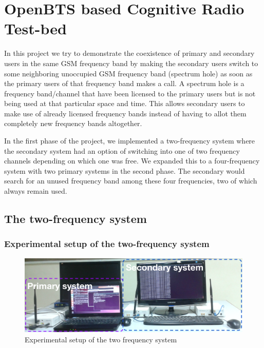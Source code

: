 \chapter{OpenBTS based Cognitive Radio Test-bed}

In this project we try to demonstrate the coexistence of primary and secondary
users in the same GSM frequency band by making the secondary users switch to 
some neighboring unoccupied GSM frequency band (spectrum hole) as soon as the 
primary users of that frequency band makes a call. A spectrum hole is a 
frequency band/channel that have been licensed to the primary users but is not 
being used at that particular space and time. This allows secondary users to 
make use of already licensed frequency bands instead of having to allot them 
completely new frequency bands altogether.

In the first phase of the project, we implemented a two-frequency system where
the secondary system had an option of switching into one of two frequency 
channels depending on which one was free. We expanded this to a four-frequency
system with two primary systems in the second phase. The secondary would 
search for an unused frequency band among these four frequencies, two of which
always remain used.

\section{The two-frequency system}
\subsection{Experimental setup of the two-frequency system}

\begin{figure}
\centering
\includegraphics[width=1\textwidth]{../images/freq2}
\caption[Experimental setup, 2-frequency system]{Experimental setup of the two
 frequency system}
\label{freq2}
\end{figure}



